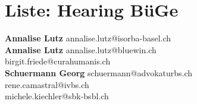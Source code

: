 \documentclass{scrartcl}
\begin{document}
\section*{Liste: Hearing BüGe}
\textbf{Annalise Lutz } annalise.lutz@isorba-basel.ch\\
\textbf{Annalise Lutz } annalise.lutz@bluewin.ch\\
\textbf{} birgit.friede@curahumanis.ch\\
\textbf{Schuermann Georg } schuermann@advokaturbs.ch\\
\textbf{} rene.camastral@ivbs.ch\\
\textbf{} michele.kiechler@sbk-bsbl.ch\\
\end{document}
